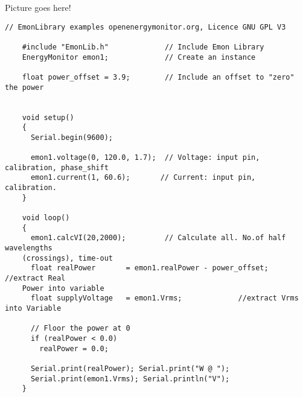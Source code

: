 \vspace{0.1in}
\begin{minipage}[t]{0.49\tw}

  \vspace{0.1in}
    Picture goes here!

\end{minipage}
\hfill
\begin{minipage}[t]{0.49\tw}
  \vspace{0.1in}
  \begin{Verbatim}[gobble=3,fontsize=\small]
    // EmonLibrary examples openenergymonitor.org, Licence GNU GPL V3

    #include "EmonLib.h"             // Include Emon Library
    EnergyMonitor emon1;             // Create an instance

    float power_offset = 3.9;        // Include an offset to "zero" the power


    void setup()
    {  
      Serial.begin(9600);
      
      emon1.voltage(0, 120.0, 1.7);  // Voltage: input pin, calibration, phase_shift
      emon1.current(1, 60.6);       // Current: input pin, calibration.
    }

    void loop()
    {
      emon1.calcVI(20,2000);         // Calculate all. No.of half wavelengths
    (crossings), time-out
      float realPower       = emon1.realPower - power_offset;        //extract Real
    Power into variable
      float supplyVoltage   = emon1.Vrms;             //extract Vrms into Variable
      
      // Floor the power at 0 
      if (realPower < 0.0)
        realPower = 0.0;

      Serial.print(realPower); Serial.print("W @ "); 
      Serial.print(emon1.Vrms); Serial.println("V");
    }
  \end{Verbatim}
\end{minipage}
\vspace{0.1in}

